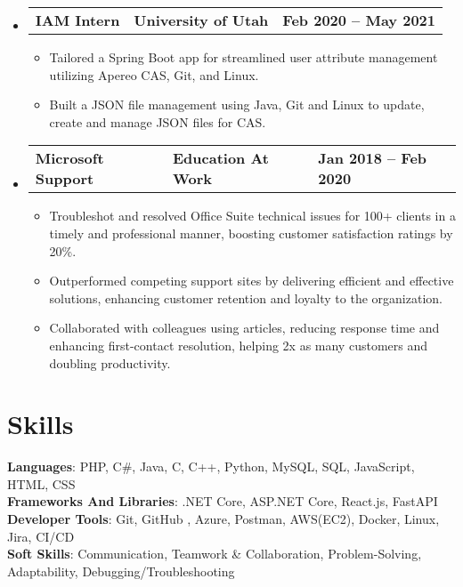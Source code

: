 \documentclass[letterpaper,11pt]{article}
\begin{document}
\begin{itemize}[leftmargin=0.05in, label={}]
	\item{
	            \begin{tabu} {X[l] X[c] X[r]}
		            \textbf{IAM Intern} & \textbf{University of Utah} & \textbf{Feb 2020 -- May 2021} \\
	            \end{tabu}

	            \begin{itemize}[label=$\bullet$]
		            \item{Tailored a Spring Boot app for streamlined user attribute management utilizing Apereo CAS, Git, and
					Linux.}
		            \item{Built a JSON file management using Java, Git and Linux to update, create and manage JSON
					files for CAS.}
	            \end{itemize}
	      }

	\item{
	            \begin{tabu} {X[l] X[c] X[r]}
		            \textbf{Microsoft Support} & \textbf{Education At Work} & \textbf{Jan 2018 -- Feb 2020} \\
	            \end{tabu}
	            \begin{itemize} [label=$\bullet$]
		            \item{Troubleshot and resolved Office Suite technical issues for 100+ clients in a timely and professional
					manner,
					boosting customer satisfaction ratings by 20\%.}
		            \item{Outperformed competing support sites by delivering efficient and effective solutions, enhancing
					customer retention and loyalty to the organization.}
		            \item{Collaborated with colleagues using articles, reducing response time and enhancing first-contact
					resolution, helping 2x as many customers and doubling productivity.}
	            \end{itemize}
	      }

\end{itemize}


\section{\textbf{Skills}}
\begin{itemize}[leftmargin=0.05in, label={}]
	{\item{
		            \textbf{Languages}{: PHP, C\#, Java, C, C++, Python, MySQL, SQL, JavaScript, HTML, CSS} \\
		            \textbf{Frameworks And Libraries}{: .NET Core, ASP.NET Core, React.js, FastAPI} \\
		            \textbf{Developer Tools}{: Git, GitHub , Azure, Postman, AWS(EC2), Docker, Linux, Jira, CI/CD} \\
					\textbf{Soft Skills}{: Communication, Teamwork \& Collaboration, Problem-Solving, Adaptability, Debugging/Troubleshooting} \\
		      }}
\end{itemize}
\end{document}
